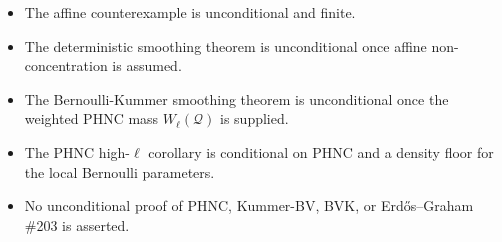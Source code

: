\documentclass[11pt]{article}
\begin{document}
\begin{itemize}[leftmargin=2em]
\item The affine counterexample is unconditional and finite.
\item The deterministic smoothing theorem is unconditional once affine non-concentration is assumed.
\item The Bernoulli-Kummer smoothing theorem is unconditional once the weighted PHNC mass \(W_\ell(\mathcal Q)\) is supplied.
\item The PHNC high-\(\ell\) corollary is conditional on PHNC and a density floor for the local Bernoulli parameters.
\item No unconditional proof of PHNC, Kummer-BV, BVK, or Erd\H{o}s--Graham \#203 is asserted.
\end{itemize}
\end{document}
